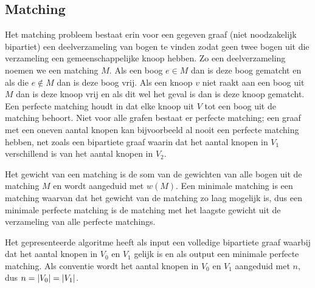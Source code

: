 \documentclass[conference]{IEEEtran}
\theoremstyle{definition}
\theoremstyle{remark}
\DeclarePairedDelimiter{\card}{\vert}{\vert}  %
\begin{document}
\subsection{Matching}
Het matching probleem bestaat erin voor een gegeven graaf (niet noodzakelijk bipartiet) een deelverzameling van bogen te vinden zodat geen twee bogen uit die verzameling een gemeenschappelijke knoop hebben. Zo een deelverzameling noemen we een matching $M$. Als een boog $e \in M$ dan is deze boog gematcht en als die $e \notin M$ dan is deze boog vrij. Als een knoop $v$ niet raakt aan een boog uit $M$ dan is deze knoop vrij en als dit wel het geval is dan is deze knoop gematcht. Een perfecte matching houdt in dat elke knoop uit $V$ tot een boog uit de matching behoort. Niet voor alle grafen bestaat er perfecte matching; een graaf met een oneven aantal knopen kan bijvoorbeeld al nooit een perfecte matching hebben, net zoals een bipartiete graaf waarin dat het aantal knopen in $V_1$ verschillend is van het aantal knopen in $V_2$.

Het gewicht van een matching is de som van de gewichten van alle bogen uit de matching $M$ en wordt aangeduid met $w(M)$. Een minimale matching is een matching waarvan dat het gewicht van de matching zo laag mogelijk is, dus een minimale perfecte matching is de matching met het laagste gewicht uit de verzameling van alle perfecte matchings.

Het gepresenteerde algoritme heeft als input een volledige bipartiete graaf waarbij dat het aantal knopen in $V_0$ en $V_1$ gelijk is en als output een minimale perfecte matching. Als conventie wordt het aantal knopen in $V_0$ en $V_1$ aangeduid met $n$, dus $n = \card{V_0} = \card{V_1}$.
\end{document}

